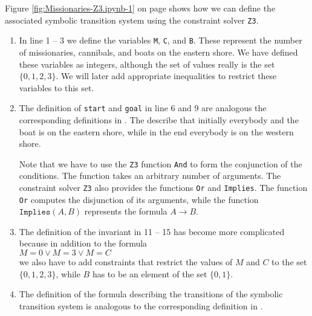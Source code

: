 Figure \ref{fig:Missionaries-Z3.ipynb-1} on page \pageref{fig:Missionaries-Z3.ipynb-1} shows how we can define
the associated symbolic transition system using the constraint solver \texttt{Z3}.
\begin{enumerate}
\item In line 1 -- 3 we define the variables \texttt{M}, \texttt{C}, and \texttt{B}.  These represent the
      number of missionaries, cannibals, and boats on the eastern shore.  We have defined these variables as
      integers, although the set of values really is the set $\{0,1,2,3\}$.  We will later add appropriate
      inequalities to restrict these variables to this set.
\item The definition of \texttt{start} and \texttt{goal} in line 6 and 9 are analogous the corresponding
      definitions in .  The describe that initially everybody and the boat is on
      the eastern shore, while in the end everybody is on the western shore.

      Note that we have to use the \texttt{Z3} function \texttt{And} to form the conjunction of the conditions.
      The function takes an arbitrary number of arguments.  The constraint solver \texttt{Z3} also provides the
      functions \texttt{Or} and \texttt{Implies}.  The function \texttt{Or} computes the disjunction of its
      arguments, while the function $\texttt{Implies}(A, B)$ represents the formula $A \rightarrow B$.
\item The definition of the invariant in 11 -- 15 has become more complicated because in addition to the
      formula 
      \\[0.2cm]
      \hspace*{1.3cm}
      $M = 0 \vee M = 3 \vee M = C$
      \\[0.2cm]
      we also have to add constraints that restrict the values of $M$ and $C$ to the set $\{0, 1, 2, 3\}$,
      while $B$ has to be an element of the set $\{0,1\}$.
\item The definition of the formula describing the transitions of the symbolic transition system is 
      analogous to the corresponding definition in .
\end{enumerate}

